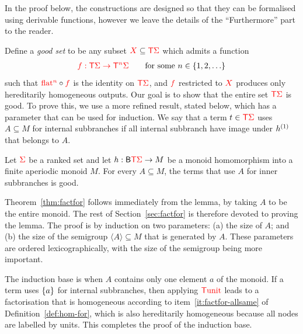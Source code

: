 \newcommand{\hint}{\bar h}
\newcommand{\hintplus}{\bar h^+}
\newcommand{\branchesplus}{\mathsf B^+}


In the proof below, the constructions  are designed so that they can be formalised using derivable functions, however we leave the details of  the ``Furthermore'' part to the reader. 

Define a \emph{good set} to be any subset  $\ranked X \subseteq  \tmonad \rSigma$ which admits a function 
\begin{align*}
    \ranked {f : \tmonad \rSigma \to \tmonad^n \rSigma}   \qquad \text{for some $n \in \set{1,2,\ldots}$}
\end{align*}
such that $\flatn n \circ \ranked f$ is the identity on $\tmonad \rSigma$, and    $\ranked f$ restricted to $\ranked X$ produces only hereditarily homogeneous outputs. Our goal is to show that the entire set $\tmonad \rSigma$ is good. To prove this, we use a more refined result, stated below, which has a parameter  that can be used for  induction.  We say that a term $t \in \tmonad \rSigma$ uses $A \subseteq M$ for  internal subbranches if all  internal subbranch have image under $\hb 1 h$ that belongs to $A$. 

\begin{lemma}\label{lem:fact-ind}
    Let $\rSigma$ be a  ranked set and let $h : \branches \tmonad \rSigma \to M$ be a monoid homomorphism into a finite aperiodic monoid $M$. For every $A \subseteq M$, the  terms that use $A$ for inner subbranches  is good.
    \end{lemma}

\newcommand{\subgen}[1]{\langle #1 \rangle}
Theorem~\ref{thm:factfor} follows immediately from the  lemma, by taking $A$ to be the entire monoid. The rest of Section~\ref{sec:factfor} is therefore devoted to proving the lemma. The proof is by induction on  two parameters: (a) the size of $A$; and (b) 
the size of the semigroup $\subgen A \subseteq M$ that is  generated by $A$.
 These parameters are  ordered lexicographically, with the size of the semigroup being more important.

The induction base is when $A$ contains only one element $a$ of the monoid. If a term uses $\set a$ for  internal subbranches, then applying $\tmonad \unit$ leads to a factorisation that is  homogeneous according to item~\ref{it:factfor-allsame} of Definition~\ref{def:hom-for}, which is also hereditarily homogeneous because all nodes are labelled by units. This completes the proof of the induction base.

